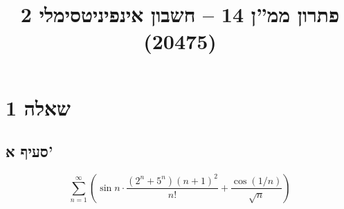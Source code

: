 
\title{פתרון ממ''ן 14 – חשבון אינפיניטסימלי 2 (20475)}


\maketitle
\maketitleprint{}
\section{שאלה 1}
\subsection{סעיף א'}
\[
	\sum_{n = 1}^\infty \left( \sin n \cdot \frac{ (2^n + 5^n) {(n + 1)}^2}{n!} + \frac{\cos(1/n)}{\sqrt{n}} \right)
\]


